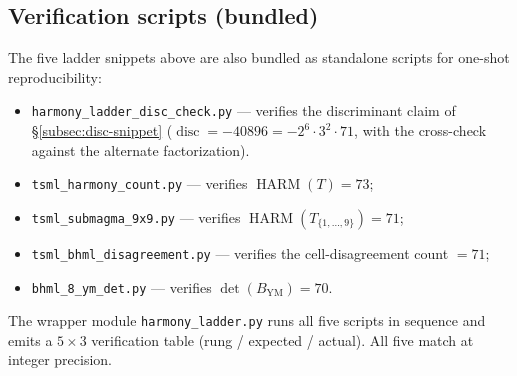 \documentclass[11pt,reqno]{amsart}
\theoremstyle{definition}
\DeclareMathOperator{\HARM}{HARM}
\DeclareMathOperator{\disc}{disc}
\begin{document}
\subsection{Verification scripts (bundled)}

The five ladder snippets above are also bundled as standalone scripts
for one-shot reproducibility:

\begin{itemize}[leftmargin=*]
\item \texttt{harmony\_ladder\_disc\_check.py} — verifies the
discriminant claim of §\ref{subsec:disc-snippet} ($\disc = -40896 =
-2^6 \cdot 3^2 \cdot 71$, with the cross-check against the alternate
factorization).
\item \texttt{tsml\_harmony\_count.py} — verifies $\HARM(T) = 73$;
\item \texttt{tsml\_submagma\_9x9.py} — verifies $\HARM(T_{\{1,\ldots,9\}}) = 71$;
\item \texttt{tsml\_bhml\_disagreement.py} — verifies the cell-disagreement count $= 71$;
\item \texttt{bhml\_8\_ym\_det.py} — verifies $\det(B_{\mathrm{YM}}) = 70$.
\end{itemize}

The wrapper module \texttt{harmony\_ladder.py} runs all five scripts
in sequence and emits a $5 \times 3$ verification table
(rung / expected / actual). All five match at integer precision.
\end{document}

